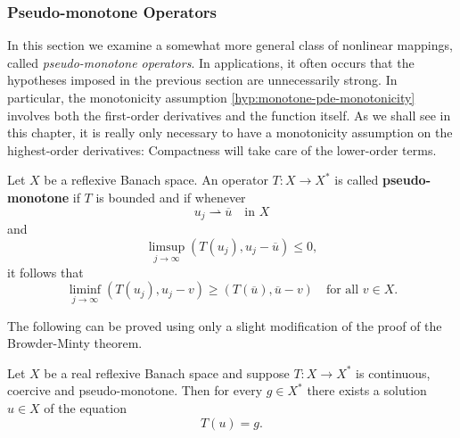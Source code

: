 \subsubsection{Pseudo-monotone Operators}\label{subsec:pseudo-monotone-operators}

In this section we examine a somewhat more general class of nonlinear mappings, called \emph{pseudo-monotone operators}. In applications, it often occurs that the hypotheses imposed in the previous section are unnecessarily strong. In particular, the monotonicity assumption \ref{hyp:monotone-pde-monotonicity} involves both the first-order derivatives and the function itself. As we shall see in this chapter, it is really only necessary to have a monotonicity assumption on the highest-order derivatives: Compactness will take care of the lower-order terms.

\begin{Definition}
\label{def:pseudo-monotone-operator}
Let $X$ be a reflexive Banach space. An operator $T:X\to X^*$ is called \textbf{pseudo-monotone} if $T$ is bounded and if whenever
\begin{equation}\label{eq:pseudo-monotonicity-weak-sequence}
u_j\rightharpoonup\overline u\quad\text{in }X
\end{equation}
and
\begin{equation}\label{eq:pseudo-monotonicity-limsup-hypothesis}
\limsup_{j\to\infty}(T(u_j),u_j-\overline u)\leq0,
\end{equation}
it follows that
\begin{equation}\label{eq:pseudo-monotonicity-liminf-conclusion}
\liminf_{j\to\infty}(T(u_j),u_j-v)\geq(T(\overline u),\overline u-v)\quad\text{for all }v\in X.
\end{equation}

\end{Definition}

The following can be proved using only a slight modification of the proof of the Browder-Minty theorem.

\begin{Theorem}
\label{thm:pseudo-monotone-surjectivity}
Let $X$ be a real reflexive Banach space and suppose $T:X\to X^*$ is continuous, coercive and pseudo-monotone. Then for every $g\in X^*$ there exists a solution $u\in X$ of the equation
\begin{equation}\label{eq:pseudo-monotone-surjectivity-equation}
T(u)=g.
\end{equation}

\end{Theorem}

